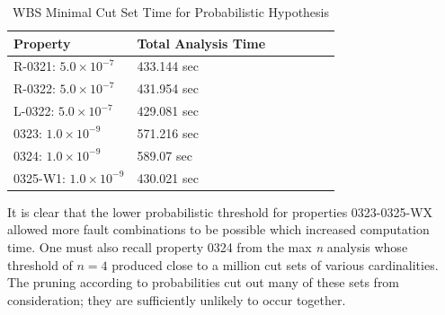\begin{table}[htbp]
\begin{center}
    \begin{tabular}{ | l | l | l | l | l | l | l | }
    \hline
    \textbf{Property} & Total Analysis Time   \\ \hline \hline
    R-0321: $5.0 \times 10^{-7}$ & 433.144 sec  \\ \hline
    R-0322: $5.0 \times 10^{-7}$  & 431.954 sec  \\ \hline
    L-0322: $5.0 \times 10^{-7}$  & 429.081 sec    \\ \hline
    0323: $1.0 \times 10^{-9}$  & 571.216 sec    \\ \hline
    0324: $1.0 \times 10^{-9}$ & 589.07 sec   \\ \hline
    0325-W1: $1.0 \times 10^{-9}$ & 430.021 sec    \\ \hline
    \end{tabular}
    \caption{WBS Minimal Cut Set Time for Probabilistic Hypothesis}
    \label{tab:analysisTimeWBSProb}
    \end{center}
\end{table}


It is clear that the lower probabilistic threshold for properties 0323-0325-WX allowed more fault combinations to be possible which increased computation time. One must also recall property 0324 from the max \textit{n} analysis whose threshold of $n=4$ produced close to a million cut sets of various cardinalities. The pruning according to probabilities cut out many of these sets from consideration; they are sufficiently unlikely to occur together. 

